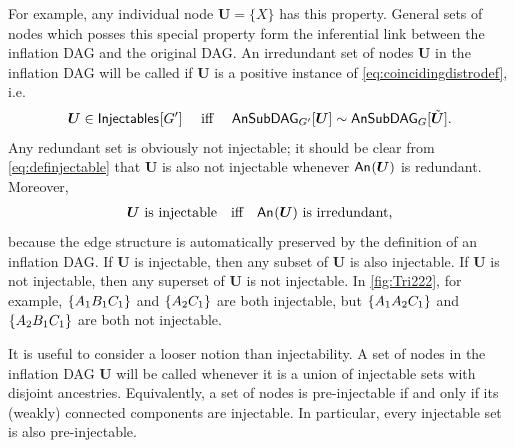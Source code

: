 For example, any individual node $\bm{U} = \{X\}$ has this property. General sets of nodes which posses this special property form the inferential link between the inflation DAG and the original DAG. An irredundant set of nodes $\bm{U}$ in the inflation DAG will be called  if $\bm{U}$ is a positive instance of \cref{eq:coincidingdistrodef}, i.e.
\begin{align}\label{eq:definjectable}
\bm{U}\in\SmallNamedFunction{Injectables}{G'} \quad\text{ iff }\quad \ansubgraph[G']{\bm{U}}\sim\ansubgraph[G]{\subsim{\bm{U}}}.
\end{align}
Any redundant set is obviously not injectable; it should be clear from \cref{eq:definjectable} that $\bm{U}$ is also not injectable whenever $\An{\bm{U}}$ is redundant. Moreover, 
\begin{align}\label{eq:definjectable2}
\bm{U} \text{ is injectable}\quad \text{iff}\quad \An{\bm{U}} \text{ is irredundant,}
\end{align}
because the edge structure is automatically preserved by the definition of an inflation DAG. If $\bm{U}$ is injectable, then any subset of $\bm{U}$ is also injectable. If $\bm{U}$ is not injectable, then any superset of $\bm{U}$ is not injectable. In \cref{fig:Tri222}, for example, $\brackets{A_1 B_1 C_1}$ and $\brackets{A_2 C_1}$ are both injectable, but $\brackets{A_1 A_2 C_1}$ and $\brackets{A_2 B_1 C_1}$ are both not injectable.

It is useful to consider a looser notion than injectability. A set of nodes in the inflation DAG $\bm{U}$ will be called  whenever it is a union of injectable sets with disjoint ancestries. Equivalently, a set of nodes is pre-injectable if and only if its (weakly) connected components are injectable. In particular, every injectable set is also pre-injectable.

